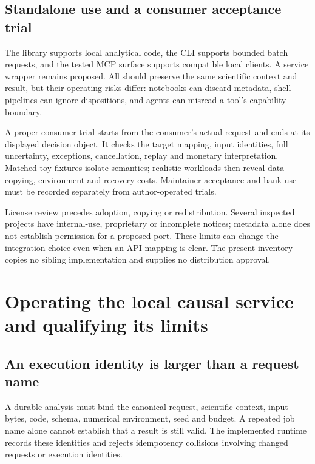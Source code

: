 \section{Standalone use and a consumer acceptance trial}

The library supports local analytical code, the CLI supports bounded batch
requests, and the tested MCP surface supports compatible local clients. A
service wrapper remains proposed. All should preserve the same scientific
context and result, but their operating risks differ: notebooks can discard
metadata, shell pipelines can ignore dispositions, and agents can misread a
tool's capability boundary.

A proper consumer trial starts from the consumer's actual request and ends at
its displayed decision object. It checks the target mapping, input identities,
full uncertainty, exceptions, cancellation, replay and monetary interpretation.
Matched toy fixtures isolate semantics; realistic workloads then reveal data
copying, environment and recovery costs. Maintainer acceptance and bank use
must be recorded separately from author-operated trials.

License review precedes adoption, copying or redistribution. Several inspected
projects have internal-use, proprietary or incomplete notices; metadata alone
does not establish permission for a proposed port.\cite{v12_in_inventory} These
limits can change the integration choice even when an API mapping is clear.
The present inventory copies no sibling implementation and supplies no
distribution approval.

\chapter{Operating the local causal service and qualifying its limits}
\label{in:operations}

\section{An execution identity is larger than a request name}

A durable analysis must bind the canonical request, scientific context, input
bytes, code, schema, numerical environment, seed and budget. A repeated job
name alone cannot establish that a result is still valid. The implemented
runtime records these identities and rejects idempotency collisions involving
changed requests or execution identities.\cite{v12_in_runtime}

